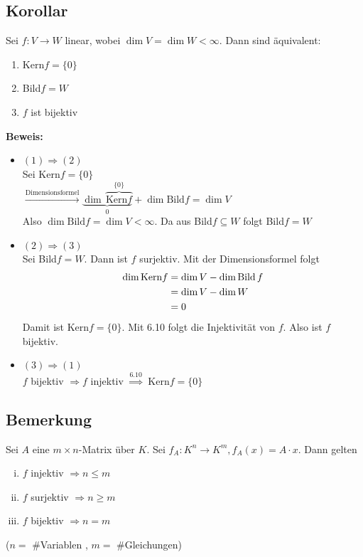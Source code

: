 \subsection{Korollar} %
\label{sub:korollar}
Sei $f : V \to W$ linear, wobei $\dim V = \dim W < \infty$. Dann sind äquivalent:
\begin{enumerate}[(1)]
	\item Kern$f = \{0\}$
	\item Bild$f = W$
	\item $f$ ist bijektiv
\end{enumerate}
\textbf{Beweis:}
\begin{itemize}
	\item $(1) \Rightarrow (2)$ \\
	Sei Kern$f = \{0\}$ \\
	$\xrightarrow{\text{Dimensionsformel}} \underbrace{\dim \, \overbrace{\text{Kern}f}^{\{0\}}}_{0} + \dim \text{Bild}f = \dim 	V$ \\
	Also $\dim \text{Bild}f = \dim V < \infty$. Da aus Bild$f \subseteq W$ folgt Bild$f =W$ 
	\item $(2)\Rightarrow (3)$ \\
	Sei Bild$f =W$. Dann ist $f$ surjektiv. Mit der Dimensionsformel folgt 
	\begin{align*}
		\dim \text{Kern}f &= \dim V - \dim \operatorname{Bild} f \\
		&= \dim V - \dim W \\
		&= 0
	\end{align*}
	Damit ist Kern$f = \{0\}$. Mit 6.10 folgt die Injektivität von $f$. Also ist $f$ bijektiv.
	\item $(3) \Rightarrow (1)$ \\
	$f$ bijektiv $\Rightarrow f$ injektiv $\overset{6.10}{\Rightarrow}$ Kern$f = \{0\}$
\end{itemize}

\subsection{Bemerkung} %
\label{sub:bemerkung}
Sei $A$ eine $m \times n$-Matrix über $K$. Sei $f_A : K^n \to K^m , f_A (x) = A \cdot x$. Dann gelten
\begin{enumerate}[(i)]
	\item $f$ injektiv $\Rightarrow n \leq m$
	\item $f$ surjektiv $\Rightarrow n \geq m$
	\item $f$ bijektiv $\Rightarrow n =m$
\end{enumerate}
{\small ($n =$ \#Variablen , $m = $ \#Gleichungen)}

